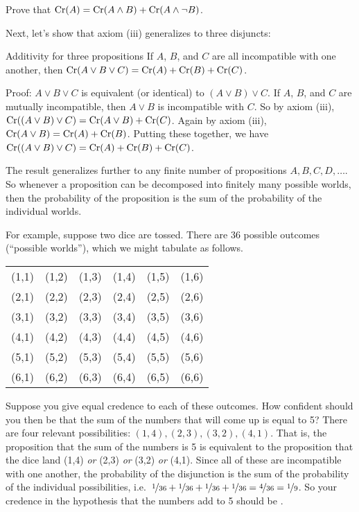 \begin{exercise}\label{exerc:partition}
  Prove that $\text{Cr}(A) = \text{Cr}(A\land B) + \text{Cr}(A \land \neg B)$.
\end{exercise}

Next, let's show that axiom (iii) generalizes to three disjuncts:

\begin{genericthm}{Additivity for three propositions}
  If $A$, $B$, and $C$ are all incompatible with one another, then
  $\text{Cr}(A \lor B \lor C) = \text{Cr}(A) + \text{Cr}(B) + \text{Cr}(C)$.
\end{genericthm}
Proof: $A \lor B \lor C$ is equivalent (or identical) to $(A \lor B) \lor C$. If
$A$, $B$, and $C$ are mutually incompatible, then $A \lor B$ is
incompatible with $C$. So by axiom (iii), $\text{Cr}((A \lor B) \lor C) =
\text{Cr}(A \lor B) + \text{Cr}(C)$. Again by axiom (iii), $\text{Cr}(A \lor B) = \text{Cr}(A)
+ \text{Cr}(B)$. Putting these together, we have $\text{Cr}((A \lor B) \lor C) =
\text{Cr}(A) + \text{Cr}(B) + \text{Cr}(C)$. 

The result generalizes further to any finite number of propositions
$A,B,C,D,\ldots$. So whenever a proposition can be decomposed into
finitely many possible worlds, then the probability of the proposition
is the sum of the probability of the individual worlds.

For example, suppose two dice are tossed. There are 36 possible
outcomes (``possible worlds''), which we might tabulate as follows.
%
\begin{center}
\begin{tabular}{cccccc}
  (1,1) & (1,2) & (1,3) & (1,4) & (1,5) & (1,6)\\
  (2,1) & (2,2) & (2,3) & (2,4) & (2,5) & (2,6)\\
  (3,1) & (3,2) & (3,3) & (3,4) & (3,5) & (3,6)\\
  (4,1) & (4,2) & (4,3) & (4,4) & (4,5) & (4,6)\\
  (5,1) & (5,2) & (5,3) & (5,4) & (5,5) & (5,6)\\
  (6,1) & (6,2) & (6,3) & (6,4) & (6,5) & (6,6)
\end{tabular}
\end{center}
%
Suppose you give equal credence  to each of these
outcomes. How confident should you then be that the sum of the numbers
that will come up is equal to 5? There are four relevant possibilities:
$(1,4), (2,3), (3,2), (4,1)$. That is, the proposition that the sum of
the numbers is 5 is equivalent to the proposition that the dice land
(1,4) \emph{or} (2,3) \emph{or} (3,2) \emph{or} (4,1).  Since all of
these are incompatible with one another, the probability of the
disjunction is the sum of the probability of the individual
possibilities, i.e.\ $\nicefrac{1}{36} + \nicefrac{1}{36} +
\nicefrac{1}{36} + \nicefrac{1}{36} = \nicefrac{4}{36} =
\nicefrac{1}{9}$. So your credence in the hypothesis that the numbers
add to 5 should be .


